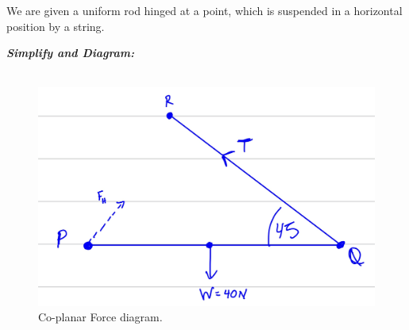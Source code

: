 %
%
%


\begin{subquestions}
	
\subquestion
We are given a uniform rod hinged at a point, which is suspended in a horizontal position by a string.

\begin{subsubquestions}

\subsubquestion
	
\textbf{\textit{Simplify and Diagram:}} \\ \\
\begin{figure}[H]
	\begin{center}
		\includegraphics[scale=0.25]{../2013/figures/2013q5-1}
		\caption{\label{2013:q5:Diagram1} Co-planar Force diagram.}
	\end{center}
\end{figure}



\end{subsubquestions}
\end{subquestions}
